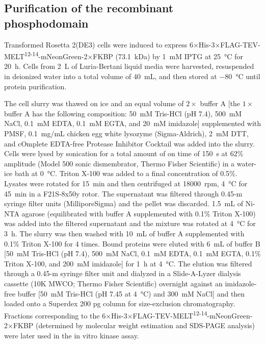 \subsection{Purification of the recombinant  phosphodomain}
\label{M3Purification}
Transformed Rosetta\texttrademark{} 2(DE3) cells were induced to express 6×His-3×FLAG-TEV-MELT\textsuperscript{12-14}-mNeonGreen-2×FKBP (\SI{73.1}{kDa}) by \SI{1}{mM} IPTG at \SI{25}{\celsius} for \SI{20}{h}. Cells from \SI{2}{L} of Luria-Bertani liquid media were harvested, resuspended in deionized water into a total volume of \SI{40}{mL}, and then stored at \SI{-80}{\celsius} until protein purification.

The cell slurry was thawed on ice and an equal volume of $2\times$ buffer A [the $1\times$ buffer A has the following composition: \SI{50}{mM} Tris-HCl (pH 7.4), \SI{500}{mM} NaCl, \SI{0.1}{mM} EDTA, \SI{0.1}{mM} EGTA, and \SI{20}{mM} imidazole] supplemented with PMSF, \SI{0.1}{mg/mL} chicken egg white lysozyme (Sigma-Aldrich), \SI{2}{mM} DTT, and cOmplete\texttrademark{} EDTA-free Protease Inhibitor Cocktail was added into the slurry. Cells were lysed by sonication for a total amount of on time of \SI{150}{s} at 62\% amplitude (Model 500 sonic dismembrator, Thermo Fisher Scientific) in a water-ice bath at \SI{0}{\celsius}. Triton X-100 was added to a final concentration of 0.5\%. Lysates were rotated for \SI{15}{min} and then centrifuged at \SI{18000}{rpm}, \SI{4}{\celsius} for \SI{45}{min} in a F21S-8x50y rotor. The supernatant was filtered through 0.45-\textmu{}m syringe filter units (MilliporeSigma) and the pellet was discarded. \SI{1.5}{mL} of Ni-NTA agarose (equilibrated with buffer A supplemented with 0.1\% Triton X-100) was added into the filtered supernatant and the mixture was rotated at \SI{4}{\celsius} for \SI{3}{h}. The slurry was then washed with \SI{10}{mL} of buffer A supplemented with 0.1\% Triton X-100 for 4 times. Bound proteins were eluted with \SI{6}{mL} of buffer B [\SI{50}{mM} Tris-HCl (pH 7.4), \SI{500}{mM} NaCl, \SI{0.1}{mM} EDTA, \SI{0.1}{mM} EGTA, 0.1\% Triton X-100, and \SI{200}{mM} imidazole] for \SI{1}{h} at \SI{4}{\celsius}. The elution was filtered through a 0.45-\textmu{}m syringe filter unit and dialyzed in a Slide-A-Lyzer\texttrademark{} dialysis cassette (10K MWCO; Thermo Fisher Scientific) overnight against an imidazole-free buffer [\SI{50}{mM} Tris-HCl (pH 7.45 at \SI{4}{\celsius}) and \SI{300}{mM} NaCl] and then loaded onto a Superdex 200 pg column for size-exclusion chromatography. Fractions corresponding to the 6×His-3×FLAG-TEV-MELT\textsuperscript{12-14}-mNeonGreen-2×FKBP (determined by molecular weight estimation and SDS-PAGE analysis) were later used in the in vitro kinase assay.

